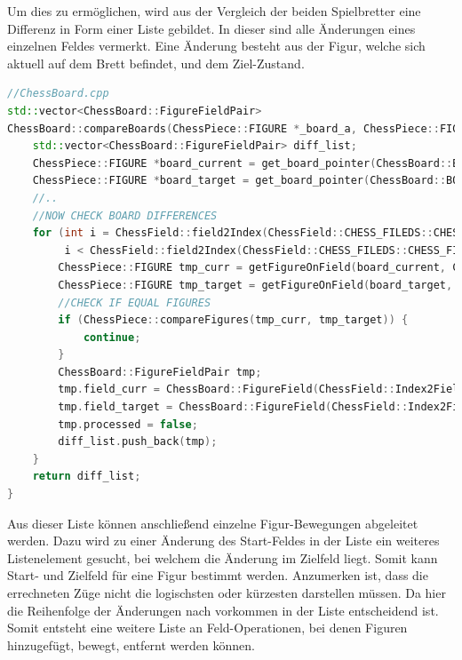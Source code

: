 Um dies zu ermöglichen, wird aus der Vergleich der beiden Spielbretter
eine Differenz in Form einer Liste gebildet. In dieser sind alle
Änderungen eines einzelnen Feldes vermerkt. Eine Änderung besteht aus
der Figur, welche sich aktuell auf dem Brett befindet, und dem
Ziel-Zustand.

\begin{lstlisting}[language={C++}]
//ChessBoard.cpp
std::vector<ChessBoard::FigureFieldPair>
ChessBoard::compareBoards(ChessPiece::FIGURE *_board_a, ChessPiece::FIGURE *_board_b, bool _include_park_pos) {
    std::vector<ChessBoard::FigureFieldPair> diff_list;
    ChessPiece::FIGURE *board_current = get_board_pointer(ChessBoard::BOARD_TPYE::REAL_BOARD);
    ChessPiece::FIGURE *board_target = get_board_pointer(ChessBoard::BOARD_TPYE::TARGET_BOARD);
    //..
    //NOW CHECK BOARD DIFFERENCES
    for (int i = ChessField::field2Index(ChessField::CHESS_FILEDS::CHESS_FIELD_A1);
         i < ChessField::field2Index(ChessField::CHESS_FILEDS::CHESS_FIELD_PARK_POSTION_WHITE_1); i++) {
        ChessPiece::FIGURE tmp_curr = getFigureOnField(board_current, ChessField::Index2Field(i));
        ChessPiece::FIGURE tmp_target = getFigureOnField(board_target, ChessField::Index2Field(i));
        //CHECK IF EQUAL FIGURES
        if (ChessPiece::compareFigures(tmp_curr, tmp_target)) {
            continue;
        }
        ChessBoard::FigureFieldPair tmp;
        tmp.field_curr = ChessBoard::FigureField(ChessField::Index2Field(i), tmp_curr);
        tmp.field_target = ChessBoard::FigureField(ChessField::Index2Field(i), tmp_target);
        tmp.processed = false;
        diff_list.push_back(tmp);
    }
    return diff_list;
}
\end{lstlisting}

Aus dieser Liste können anschließend einzelne Figur-Bewegungen
abgeleitet werden. Dazu wird zu einer Änderung des Start-Feldes in der
Liste ein weiteres Listenelement gesucht, bei welchem die Änderung im
Zielfeld liegt. Somit kann Start- und Zielfeld für eine Figur bestimmt
werden. Anzumerken ist, dass die errechneten Züge nicht die logischsten
oder kürzesten darstellen müssen. Da hier die Reihenfolge der Änderungen
nach vorkommen in der Liste entscheidend ist. Somit entsteht eine
weitere Liste an Feld-Operationen, bei denen Figuren hinzugefügt,
bewegt, entfernt werden können.

